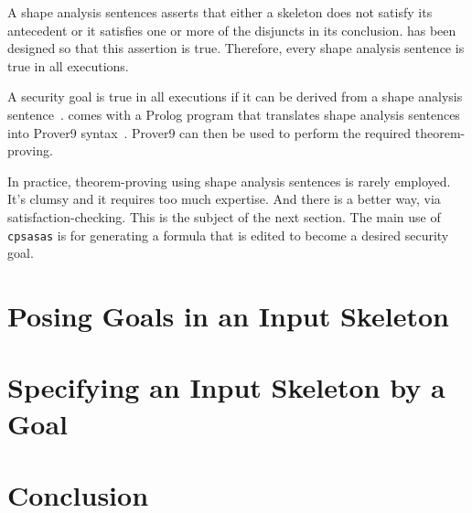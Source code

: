 \documentclass[12pt]{article}
\begin{document}
A shape analysis sentences asserts that either a skeleton does not
satisfy its antecedent or it satisfies one or more of the disjuncts in
its conclusion.  {\cpsa} has been designed so that this assertion is
true.  Therefore, every shape analysis sentence is true in all
executions.

A security goal is true in all executions if it can be derived from a
shape analysis sentence~\cite{Ramsdell12}.  {\cpsa} comes with a
Prolog program that translates shape analysis sentences into Prover9
syntax~\cite{prover9}.  Prover9 can then be used to perform the
required theorem-proving.

In practice, theorem-proving using shape analysis sentences is rarely
employed.  It's clumsy and it requires too much expertise.  And there
is a better way, via satisfaction-checking.  This is the subject of
the next section.  The main use of \texttt{cpsasas} is for generating
a formula that is edited to become a desired security goal.

\section{Posing Goals in an Input Skeleton}\label{sec:posing}

\section{Specifying an Input Skeleton by a Goal}\label{sec:specifying}

\section{Conclusion}\label{sec:conclusion}



\end{document}

